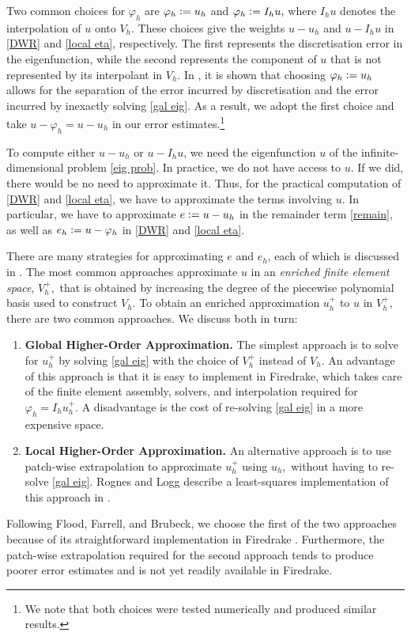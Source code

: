 
Two common choices for $\varphi_h$ are $\varphi_h \vcentcolon= u_h$ and $\varphi_h  \vcentcolon= I_h u,$ where $I_hu$ denotes the interpolation of $u$ onto $V_h.$ These choices give the weights $u - u_h$ and $u - I_h u$ in \eqref{DWR} and \eqref{local eta}, respectively. The first represents the discretisation error in the eigenfunction, while the second represents the component of $u$ that is not represented by its interpolant in $V_h.$ In \cite{balance_errs}, it is shown that choosing $\varphi_h \vcentcolon= u_h$ allows for the separation of the error incurred by discretisation and the error incurred by inexactly solving \eqref{gal eig}. As a result, we adopt the first choice and take $u- \varphi_h = u - u_h$ in our error estimates.\footnote{We note that both choices were tested numerically and produced similar results.}

To compute either $u-u_h$ or $u - I_h u$, we need the eigenfunction $u$ of the infinite-dimensional problem \eqref{eig prob}. In practice, we do not have access to $u.$ If we did, there would be no need to approximate it. Thus, for the practical computation of \eqref{DWR} and \eqref{local eta}, we have to approximate the terms involving $u.$ In particular, we have to approximate $e \vcentcolon= u-u_h$ in the remainder term \eqref{remain}, as well as $e_h \vcentcolon= u - \varphi_h$ in \eqref{DWR} and \eqref{local eta}. 

There are many strategies for approximating $e$ and $e_h$, each of which is discussed in \cite{Becker, Bangerth, Heuveline}. The most common approaches approximate $u$ in an \textit{enriched finite element space}, $V_h^+,$  that is obtained by increasing the degree of the piecewise polynomial basis used to construct $V_h.$ To obtain an enriched approximation $u_h^+$ to $u$ in $V_h^+,$ there are two common approaches. We discuss both in turn:
\begin{enumerate}
    \item \textbf{Global Higher-Order Approximation.}
    The simplest approach is to solve for $u_h^+$ by solving \eqref{gal eig} with the choice of $V_h^+$ instead of $V_h.$ An advantage of this approach is that it is easy to implement in Firedrake, which takes care of the finite element assembly, solvers, and interpolation required for $\varphi_h = I_h u_h^+.$ A disadvantage is the cost of re-solving \eqref{gal eig} in a more expensive space. 
    \item \textbf{Local Higher-Order Approximation.}
    An alternative approach is to use patch-wise extrapolation to approximate $u_h^+$ using $u_h,$ without having to re-solve \eqref{gal eig}. Rognes and Logg describe a least-squares implementation of this approach in \cite{logg}. 
\end{enumerate}
Following Flood, Farrell, and Brubeck, we choose the first of the two approaches because of its straightforward implementation in Firedrake \cite{joe, pablo}. Furthermore, the patch-wise extrapolation required for the second approach tends to produce poorer error estimates and is not yet readily available in Firedrake.

